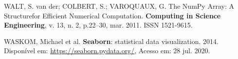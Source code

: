 \documentclass[12pt, a4paper,brazil,oneside]{article}
\begin{document}
\begin{thebibliography}{99}
		{WALT, S. van der; COLBERT, S.; VAROQUAUX, G. The NumPy Array: A Structurefor Efficient Numerical Computation. \textbf{Computing in Science Engineering}, v. 13, n. 2, p.22–30, mar. 2011. ISSN 1521-9615.}
		
		{WASKOM, Michael et al. \textbf{Seaborn}: statistical data visualization. 2014. Disponível em: \url{https://seaborn.pydata.org/}, Acesso em: 28 jul. 2020.}
		
		
		
		
		
		
	\end{thebibliography}
	
	
	
\end{document}
